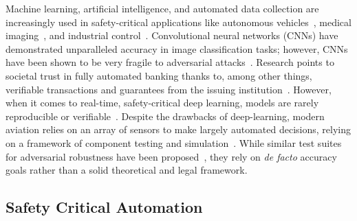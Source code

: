 \documentclass[lettersize,journal]{IEEEtran}
\begin{document}
Machine learning, artificial intelligence, and automated data collection are increasingly used in safety-critical applications like autonomous vehicles~\cite{grigorescu2020survey, al2017deep}, medical imaging~\cite{ching2017opportunities, sahiner2019deep}, and industrial control~\cite{fukuda1992theory, monmasson2011fpgas}. Convolutional neural networks (CNNs) have demonstrated unparalleled accuracy in image classification tasks; however, CNNs have been shown to be very fragile to adversarial attacks~\cite{miller_adversarial_2020, finlayson2018adversarial}.  Research points to societal trust in fully automated banking thanks to, among other things, verifiable transactions and guarantees from the issuing institution~\cite{safetyframework}. However, when it comes to real-time, safety-critical deep learning, models are rarely reproducible or verifiable~\cite{tsipras_robustness_2019, carlini_towards_2017}. Despite the drawbacks of deep-learning, modern aviation relies on an array of sensors to make largely automated decisions, relying on a framework of component testing and simulation~\cite{aviation}. While similar test suites for adversarial robustness have been proposed~\cite{carlini_towards_2017, chakraborty_adversarial_2018}, they rely on \textit{de facto} accuracy goals rather than a solid theoretical and legal framework.


\subsection{Safety Critical Automation}
\label{safety-critical}
\end{document}
